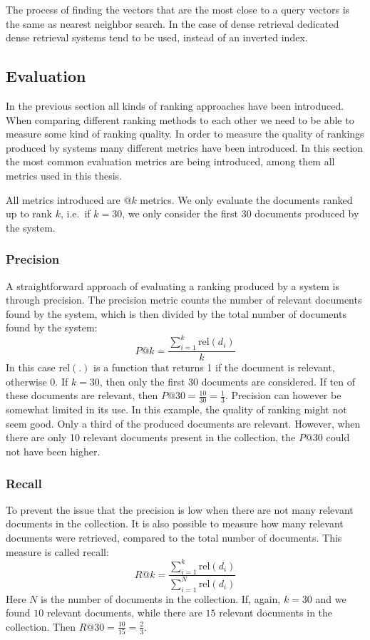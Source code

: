 The process of finding the vectors that are the most close to a query vectors is the same as nearest neighbor search. In the case of dense retrieval dedicated dense retrieval systems tend to be used, instead of an inverted index. 

\subsection{Evaluation}
\label{sec:evaluation}
In the previous section all kinds of ranking approaches have been introduced. When comparing different ranking methods to each other we need to be able to measure some kind of ranking quality. In order to measure the quality of rankings produced by systems many different metrics have been introduced. In this section the most common evaluation metrics are being introduced, among them all metrics used in this thesis. 

All metrics introduced are $@k$ metrics. We only evaluate the documents ranked up to rank $k$, i.e.\ if $k=30$, we only consider the first $30$ documents produced by the system.

\subsubsection{Precision}
A straightforward approach of evaluating a ranking produced by a system is through precision. The precision metric counts the number of relevant documents found by the system, which is then divided by the total number of documents found by the system:
\begin{equation}
	\textit{P}@k = \frac{\sum_{i=1}^k\text{rel}\left(d_i\right)}{k}
\end{equation}
In this case $\text{rel}(.)$ is a function that returns 1 if the document is relevant, otherwise 0.
If $k=30$, then only the first $30$ documents are considered. If ten of these documents are relevant, then $P@30 = \frac{10}{30} = \frac{1}{3}$. Precision can however be somewhat limited in its use. In this example, the quality of ranking might not seem good. Only a third of the produced documents are relevant. However, when there are only 10 relevant documents present in the collection, the $P@30$ could not have been higher. 

\subsubsection{Recall}
To prevent the issue that the precision is low when there are not many relevant documents in the collection. It is also possible to measure how many relevant documents were retrieved, compared to the total number of documents. This measure is called recall: 
\begin{equation}
	\textit{R}@k = \frac{\sum_{i=1}^k\text{rel}\left(d_i\right)}{\sum_{i=1}^N\text{rel}\left(d_i\right)}
\end{equation}
Here $N$ is the number of documents in the collection. If, again, $k=30$ and we found $10$ relevant documents, while there are $15$ relevant documents in the collection. Then $R@30 = \frac{10}{15} = \frac{2}{3}$.


